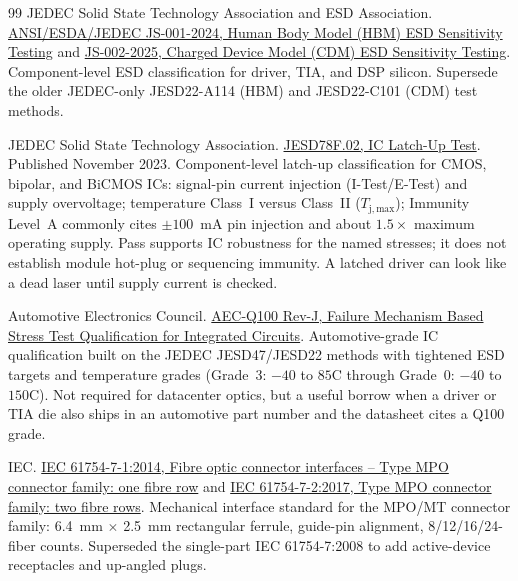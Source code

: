 \begin{thebibliography}{99}
JEDEC Solid State Technology Association and ESD Association.
\newblock \href{https://www.jedec.org/standards-documents/docs/js-001-2023}{ANSI/ESDA/JEDEC JS-001-2024, Human Body Model (HBM) ESD Sensitivity Testing}
and \href{https://www.jedec.org/standards-documents/docs/js002-2014}{JS-002-2025, Charged Device Model (CDM) ESD Sensitivity Testing}.
\newblock Component-level ESD classification for driver, TIA, and DSP silicon.
Supersede the older JEDEC-only JESD22-A114 (HBM) and JESD22-C101 (CDM) test methods.

JEDEC Solid State Technology Association.
\newblock \href{https://www.jedec.org/standards-documents/docs/jesd-78b}{JESD78F.02, IC Latch-Up Test}.
\newblock Published November 2023. Component-level latch-up classification for
CMOS, bipolar, and BiCMOS ICs: signal-pin current injection (I-Test/E-Test) and
supply overvoltage; temperature Class~I versus Class~II ($T_\mathrm{j,max}$);
Immunity Level~A commonly cites $\pm100$~mA pin injection and about
$1.5\times$ maximum operating supply. Pass supports IC robustness for the named
stresses; it does not establish module hot-plug or sequencing immunity. A
latched driver can look like a dead laser until supply current is checked.

Automotive Electronics Council.
\newblock \href{http://aecouncil.com/}{AEC-Q100 Rev-J, Failure Mechanism Based Stress Test Qualification for Integrated Circuits}.
\newblock Automotive-grade IC qualification built on the JEDEC JESD47/JESD22
methods with tightened ESD targets and temperature grades (Grade~3:
$-40$ to $85$\textdegree C through Grade~0: $-40$ to $150$\textdegree C).
Not required for datacenter optics, but a useful borrow when a driver or TIA die
also ships in an automotive part number and the datasheet cites a Q100 grade.

IEC.
\newblock \href{https://webstore.ansi.org/standards/iec/iec61754eden2014}{IEC 61754-7-1:2014, Fibre optic connector interfaces -- Type MPO connector family: one fibre row}
and \href{https://webstore.iec.ch/en/publication/30239}{IEC 61754-7-2:2017, Type MPO connector family: two fibre rows}.
\newblock Mechanical interface standard for the MPO/MT connector family: 6.4~mm
$\times$ 2.5~mm rectangular ferrule, guide-pin alignment, 8/12/16/24-fiber counts.
Superseded the single-part IEC 61754-7:2008 to add active-device receptacles and
up-angled plugs.


\end{thebibliography}
